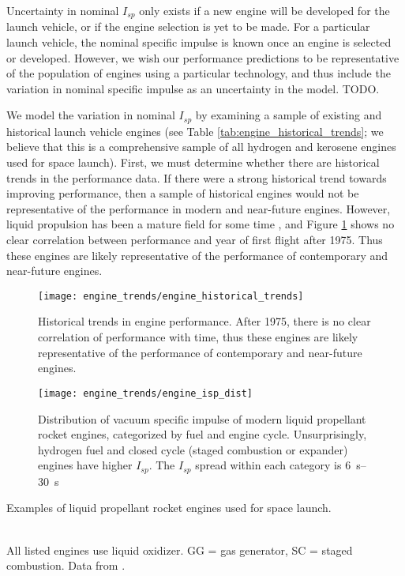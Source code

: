 \documentclass[conf]{../paper/new-aiaa}
\begin{document}
Uncertainty in nominal $I_{sp}$ only exists if a new engine will be developed for the launch vehicle, or if the engine selection is yet to be made. For a particular launch vehicle, the nominal specific impulse is known once an engine is selected or developed. However, we wish our performance predictions to be representative of the population of engines using a particular technology, and thus include the variation in nominal specific impulse as an uncertainty in the model. TODO.

We model the variation in nominal $I_{sp}$ by examining a sample of existing and historical launch vehicle engines (see Table \ref{tab:engine_historical_trends}; we believe that this is a comprehensive sample of all hydrogen and kerosene engines used for space launch). First, we must determine whether there are historical trends in the performance data. If there were a strong historical trend towards improving performance, then a sample of historical engines would not be representative of the performance in modern and near-future engines. However, liquid propulsion has been a mature field for some time \cite{hist_lpre}, and Figure \ref{fig:engine_historical_trends} shows no clear correlation between performance and year of first flight after 1975. Thus these engines are likely representative of the performance of contemporary and near-future engines.


\begin{figure}[hbt!]
    \centering
    \texttt{[image: engine\_trends/engine\_historical\_trends]}
    \caption{\label{fig:engine_historical_trends} Historical trends in engine performance. After 1975, there is no clear correlation of performance with time, thus these engines are likely representative of the performance of contemporary and near-future engines.}
\end{figure}

\begin{figure}[hbt!]
    \centering
    \texttt{[image: engine\_trends/engine\_isp\_dist]}
    \caption{\label{fig:engine_isp_dist} Distribution of vacuum specific impulse of modern liquid propellant rocket engines, categorized by fuel and engine cycle. Unsurprisingly, hydrogen fuel and closed cycle (staged combustion or expander) engines have higher $I_{sp}$. The $I_{sp}$ spread within each category is \SIrange{6}{30}{\second}}
\end{figure}

\begin{table}
    \caption{\label{tab:engine_historical_trends} Examples of liquid propellant rocket engines used for space launch.}
    \centering
    \small
    
    \\
    All listed engines use liquid  oxidizer. GG = gas generator, SC = staged combustion. Data from \cite{hist_lpre,wiki:OrbitalEngines, Falcon9}.
\end{table}
\end{document}

